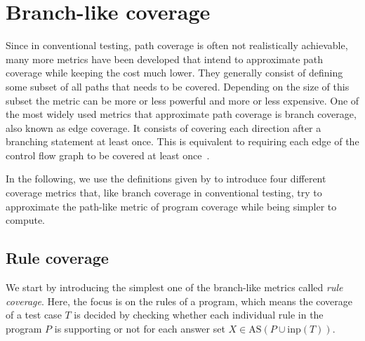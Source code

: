 \section{Branch-like coverage}
\label{sec:Coverage metrics/Branch-like coverage}
Since in conventional testing, path coverage is often not realistically achievable, many more metrics have been developed that intend to approximate path coverage while keeping the cost much lower. They generally consist of defining some subset of all paths that needs to be covered. Depending on the size of this subset the metric can be more or less powerful and more or less expensive. One of the most widely used metrics that approximate path coverage is branch coverage, also known as edge coverage. It consists of covering each direction after a branching statement at least once. This is equivalent to requiring each edge of the control flow graph to be covered at least once~\cite[Chapter 7.2]{AO16}.

In the following, we use the definitions given by \textcite{Jan+10} to introduce four different coverage metrics that, like branch coverage in conventional testing, try to approximate the path-like metric of program coverage while being simpler to compute.

\subsection{Rule coverage}
\label{subsec:Coverage metrics/Branch-like coverage/Rule coverage}
We start by introducing the simplest one of the branch-like metrics called \emph{rule coverage}. Here, the focus is on the rules of a program, which means the coverage of a test case $T$ is decided by checking whether each individual rule in the program $P$ is supporting or not for each answer set \(X \in \text{AS}(P \cup \text{inp}(T))\).

